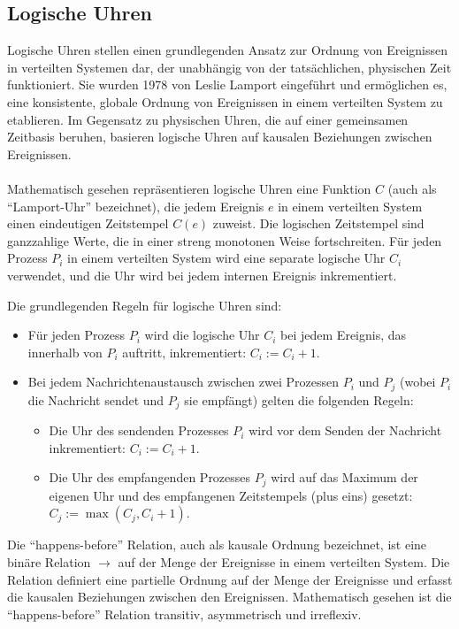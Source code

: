 \documentclass[../vs-script-first-v01.tex]{subfiles}
\begin{document}
\subsection{Logische Uhren}
Logische Uhren stellen einen grundlegenden Ansatz zur Ordnung von Ereignissen in verteilten Systemen dar, der unabhängig von der tatsächlichen, physischen Zeit funktioniert. Sie wurden 1978 von Leslie Lamport eingeführt und ermöglichen es, eine konsistente, globale Ordnung von Ereignissen in einem verteilten System zu etablieren. Im Gegensatz zu physischen Uhren, die auf einer gemeinsamen Zeitbasis beruhen, basieren logische Uhren auf kausalen Beziehungen zwischen Ereignissen.
\\\\
Mathematisch gesehen repräsentieren logische Uhren eine Funktion $C$ (auch als \enquote{Lamport-Uhr} bezeichnet), die jedem Ereignis $e$ in einem verteilten System einen eindeutigen Zeitstempel $C(e)$ zuweist. Die logischen Zeitstempel sind ganzzahlige Werte, die in einer streng monotonen Weise fortschreiten. Für jeden Prozess $P_i$ in einem verteilten System wird eine separate logische Uhr $C_i$ verwendet, und die Uhr wird bei jedem internen Ereignis inkrementiert.

Die grundlegenden Regeln für logische Uhren sind:
\begin{itemize}
\item Für jeden Prozess $P_i$ wird die logische Uhr $C_i$ bei jedem Ereignis, das innerhalb von $P_i$ auftritt, inkrementiert: $C_i := C_i + 1$.
\item Bei jedem Nachrichtenaustausch zwischen zwei Prozessen $P_i$ und $P_j$ (wobei $P_i$ die Nachricht sendet und $P_j$ sie empfängt) gelten die folgenden Regeln:
\begin{itemize}
\item Die Uhr des sendenden Prozesses $P_i$ wird vor dem Senden der Nachricht inkrementiert: $C_i := C_i + 1$.
\item Die Uhr des empfangenden Prozesses $P_j$ wird auf das Maximum der eigenen Uhr und des empfangenen Zeitstempels (plus eins) gesetzt: $C_j := \max(C_j, C_i + 1)$.
\end{itemize}    
\end{itemize}

Die \enquote{happens-before} Relation, auch als kausale Ordnung bezeichnet, ist eine binäre Relation $\to$ auf der Menge der Ereignisse in einem verteilten System. Die Relation definiert eine partielle Ordnung auf der Menge der Ereignisse und erfasst die kausalen Beziehungen zwischen den Ereignissen. Mathematisch gesehen ist die \enquote{happens-before} Relation transitiv, asymmetrisch und irreflexiv.
\end{document}
